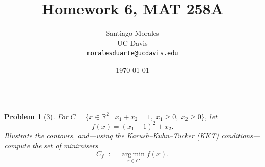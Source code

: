 \documentclass[11pt]{article}
\title{\vspace{-1cm} \textbf{Homework 6, MAT 258A}}
\author{Santiago Morales \\ UC Davis \\ \texttt{moralesduarte@ucdavis.edu}}
\date{\today}
\theoremstyle{mystyle}
\newtheorem{problem}{Problem}
\begin{document}
\maketitle
\vspace{-1em}
\hrule
\vspace{1em}

\begin{problem}[3]
        For \(C=\{x\in\mathbb{R}^{2}\mid x_{1}+x_{2}=1,\;x_{1}\ge 0,\;x_{2}\ge 0\}\),
        let
        \[
        f(x)=(x_{1}-1)^{2}+x_{2}.
        \]
        Illustrate the contours, and—using the
        Karush--Kuhn--Tucker (KKT) conditions—compute the set of minimisers
        \[
        C_{f}\;:=\;\operatorname*{arg\,min}_{x\in C}f(x).
        \]
        \end{problem}

        
\end{document}
